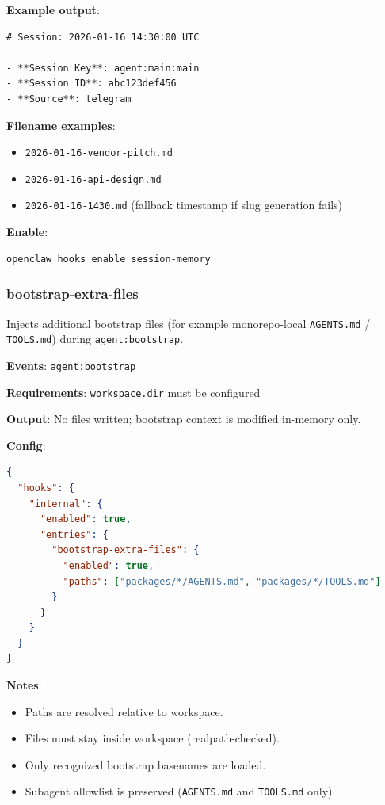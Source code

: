 \textbf{Example output}:

\begin{lstlisting}
# Session: 2026-01-16 14:30:00 UTC

- **Session Key**: agent:main:main
- **Session ID**: abc123def456
- **Source**: telegram
\end{lstlisting}


\textbf{Filename examples}:

\begin{itemize}
  \item \texttt{2026-01-16-vendor-pitch.md}
  \item \texttt{2026-01-16-api-design.md}
  \item \texttt{2026-01-16-1430.md} (fallback timestamp if slug generation fails)
\end{itemize}


\textbf{Enable}:

\begin{lstlisting}[language=bash]
openclaw hooks enable session-memory
\end{lstlisting}


\subsubsection{bootstrap-extra-files}


Injects additional bootstrap files (for example monorepo-local \texttt{AGENTS.md} / \texttt{TOOLS.md}) during \texttt{agent:bootstrap}.

\textbf{Events}: \texttt{agent:bootstrap}

\textbf{Requirements}: \texttt{workspace.dir} must be configured

\textbf{Output}: No files written; bootstrap context is modified in-memory only.

\textbf{Config}:

\begin{lstlisting}[language=json]
{
  "hooks": {
    "internal": {
      "enabled": true,
      "entries": {
        "bootstrap-extra-files": {
          "enabled": true,
          "paths": ["packages/*/AGENTS.md", "packages/*/TOOLS.md"]
        }
      }
    }
  }
}
\end{lstlisting}


\textbf{Notes}:

\begin{itemize}
  \item Paths are resolved relative to workspace.
  \item Files must stay inside workspace (realpath-checked).
  \item Only recognized bootstrap basenames are loaded.
  \item Subagent allowlist is preserved (\texttt{AGENTS.md} and \texttt{TOOLS.md} only).
\end{itemize}


